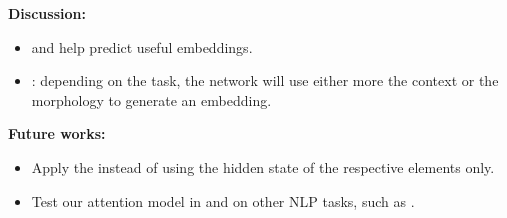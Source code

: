 \textbf{Discussion:}
\begin{itemize}
    \item {} and  help predict useful embeddings.
    \item {}: depending on the task, the network will use either more the context or the morphology to generate an embedding.
\end{itemize}

\textbf{Future works:}
\begin{itemize}
    \item  Apply the  instead of using the hidden state of the respective elements only.
    \item Test our attention model in  and on other NLP tasks, such as .
\end{itemize}
\vspace{-3.5mm}